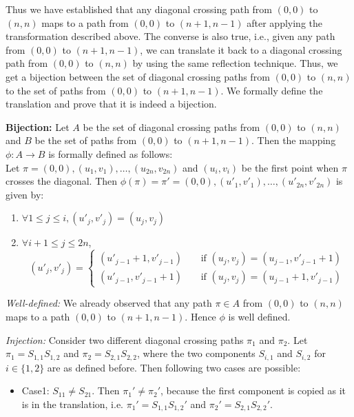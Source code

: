Thus we have established that any diagonal crossing path from $(0,0)$ to $(n,n)$ maps to a path from $(0,0)$ to $(n+1,n-1)$ after applying the transformation described above. The converse is also true, i.e., given any path from $(0,0)$ to $(n+1, n-1)$, we can translate it back to a diagonal crossing path from $(0,0)$ to $(n,n)$ by using the same reflection technique.  Thus, we get a bijection between the set of diagonal crossing paths from $(0,0)$ to $(n,n)$ to the set of paths from $(0,0)$ to $(n+1,n-1)$. We formally define the translation and prove that it is indeed a bijection.
\begin{description}
\item \textbf{Bijection:}
Let $A$ be the set of diagonal crossing paths from $(0,0)$ to $(n,n)$ and $B$ be the set of paths from $(0,0)$ to $(n+1,n-1)$. Then the mapping $\phi:A\rightarrow B$ is formally defined as follows: 
\\
Let $\pi=(0,0), (u_1,v_1), \ldots, (u_{2n}, v_{2n})$ and $(u_i, v_i)$ be the first point when $\pi$ crosses the diagonal. Then $\phi(\pi) = \pi'=(0,0), (u'_1,v'_1), \ldots, (u'_{2n}, v'_{2n})$ is given by:
\begin{enumerate}
    \item $\forall 1\le j\le i, (u'_j, v'_j) = (u_j, v_j)$
    \item $\forall i+1\le j\le 2n$, 
    \[
    (u'_j, v'_j) = 
    \begin{cases}
    (u'_{j-1}+1, v'_{j-1})& ~~~~~\text{if } (u_j, v_j) = (u_{j-1}, v'_{j-1}+1)\\
    (u'_{j-1}, v'_{j-1}+1)& ~~~~~\text{if } (u_j, v_j) = (u_{j-1}+1, v'_{j-1})
    \end{cases}
    \]
\end{enumerate}
\item \textit{Well-defined:} We already observed that any path $\pi\in A$ from $(0,0)$ to $(n,n)$ maps to a path $(0,0)$ to $(n+1,n-1)$. Hence $\phi$ is well defined.
\item \textit{Injection:} Consider two different diagonal crossing paths $\pi_1$ and $\pi_2$. Let $\pi_1 = S_{1,1}S_{1,2}$ and $\pi_2 = S_{2,1}S_{2,2}$, where the two components $S_{i,1}$ and $S_{i,2}$ for $i\in\{1,2\}$ are as defined before. Then following two cases are possible:
\begin{itemize}
    \item Case1: $S_{11}\ne S_{21}$. Then $\pi_1'\ne \pi_2'$, because the first component is copied as it is in the translation, i.e. $\pi_1' = S_{1,1}S_{1,2}'$ and $\pi_2' = S_{2,1}S_{2,2}'$.

\end{itemize}
\end{description}
